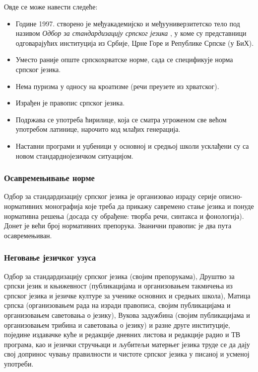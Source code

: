 \begin{multicols}{2}

 Овде се може навести следеће:
\begin{itemize}
\item Године 1997. створено је међуакадемијско и међууниверзитетско тело под називом \textit{Одбор за стандардизацију српског језика} \cite{BSSL}, у коме су представници одговарајућих институција из Србије, Црне Горе и Републике Српске (у БиХ). 
\item Уместо раније опште српскохрватске норме, сада се спецификује норма српског језика.
\item Нема пуризма у односу на кроатизме (речи преузете из хрватског). 
\item Израђен је правопис српског језика.
\item Подржава се употреба ћирилице, која се сматра угроженом све већом употребом латинице, нарочито код млађих генерација. 
\item Наставни програми и уџбеници у основној и средњој школи усклађени су са новом стандарднојезичком ситуацијом.
\end{itemize}
 
 \subsubsection {Осавремењивање норме}
   
  Одбор за стандардизацију српског језика је организовао израду серије описно-нормативних монографија које треба да прикажу савремено стање језика и понуде нормативна решења (досада су обрађене: творба речи, синтакса и фонологија). Донет је већи број нормативних препорука. Званични правопис је два пута осавремењиван.

 \subsubsection {Неговање језичког узуса}
 
Одбор за стандардизацију српског језика (својим препорукама), Друштво за српски језик и књижевност (публикацијама и организовањем такмичења из српског језика и језичке културе за ученике основних и средњих  школа), Матица српска (организовањем рада на изради правописа, својим публикацијама и организовањем саветовања о језику), Вукова задужбина (својим публикацијама и организовањем трибина и саветовања о језику) и разне друге институције, поједине издавачке куће и редакције дневних листова и редакције радио и ТВ програма, као и језички стручњаци и љубитељи матерњег језика труде се да дају свој допринос чувању правилности и чистоте српског језика у писаној и усменој употреби.  


\end{multicols}
